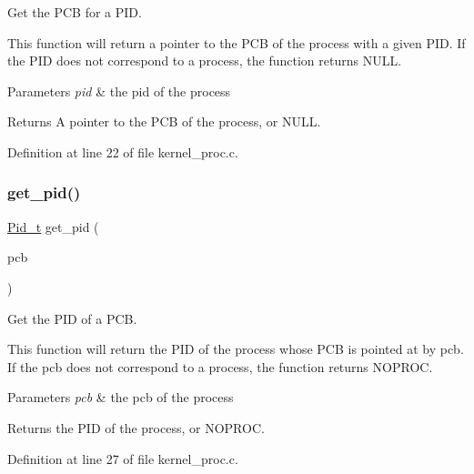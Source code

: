 Get the P\+CB for a P\+ID. 

This function will return a pointer to the P\+CB of the process with a given P\+ID. If the P\+ID does not correspond to a process, the function returns {\ttfamily N\+U\+LL}.


\begin{DoxyParams}{Parameters}
{\em pid} & the pid of the process \\
\hline
\end{DoxyParams}
\begin{DoxyReturn}{Returns}
A pointer to the P\+CB of the process, or N\+U\+LL. 
\end{DoxyReturn}


Definition at line 22 of file kernel\+\_\+proc.\+c.

\mbox{\label{group__proc_ga110e884cb053244b18d1058751a78cfe}} 
\subsubsection{\texorpdfstring{get\+\_\+pid()}{get\_pid()}}
{\footnotesize\ttfamily \hyperlink{group__syscalls_gafac07f3170763932fac97b6eab2c3984}{Pid\+\_\+t} get\+\_\+pid (\begin{DoxyParamCaption}\item[{\hyperlink{group__proc_gadf327f09ee935cf1734c14e8849f0421}{P\+CB} $\ast$}]{pcb }\end{DoxyParamCaption})}



Get the P\+ID of a P\+CB. 

This function will return the P\+ID of the process whose P\+CB is pointed at by {\ttfamily pcb}. If the pcb does not correspond to a process, the function returns {\ttfamily N\+O\+P\+R\+OC}.


\begin{DoxyParams}{Parameters}
{\em pcb} & the pcb of the process \\
\hline
\end{DoxyParams}
\begin{DoxyReturn}{Returns}
the P\+ID of the process, or N\+O\+P\+R\+OC. 
\end{DoxyReturn}


Definition at line 27 of file kernel\+\_\+proc.\+c.

\mbox{\label{group__proc_ga82948cbeb57bb0b6e15d1f14f06a2db3}} 
